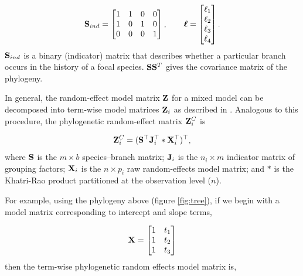 \documentclass[12pt]{article}
\begin{document}
\[
{\mathbf S}_{ind} = \begin{bmatrix}
1 & 1 & 0 & 0 \\ 
1 & 0 & 1 & 0 \\ 
0 & 0 & 0 & 1
\end{bmatrix} , 
\qquad
{\boldsymbol \ell} = \begin{bmatrix}
\ell_1 \\
\ell_2 \\
\ell_3 \\
\ell_4 
\end{bmatrix} .
\]
${\mathbf S}_{ind}$ is a binary (indicator) matrix that describes whether a particular branch occurs in the history of a focal species. 
${\mathbf S} {\mathbf S}^T$ gives the covariance matrix of the phylogeny. 

In general, the random-effect model matrix ${\mathbf Z}$ for a mixed model can be decomposed into term-wise model matrices ${\mathbf Z}_{i}$ as described in \citet{bates2015fitting}.
Analogous to this procedure, the phylogenetic random-effect matrix ${\mathbf Z}^{C}_{i}$ is

\begin{equation}
{\mathbf Z}^{C}_{i} = ({\mathbf S}^{\top}{\mathbf J}^{\top}_{i} \ast {\mathbf X}^{\top}_{i})^{\top}, \label{eq:ZC}
\end{equation}
where ${\mathbf S}$ is the $m \times b$ species--branch matrix; ${\mathbf J}_{i}$ is the $n_i \times m$ indicator matrix of grouping factors; ${\mathbf X}_{i}$ is the $n \times p_{i}$ raw random-effects model matrix; and $\ast$ is the Khatri-Rao product \citep{khatri1968solutions} partitioned at the observation level ($n$).

For example, using the phylogeny above (figure \ref{fig:tree}), if we begin with a model matrix corresponding to intercept and slope terms, 

\[
{\mathbf X} = \begin{bmatrix}
1 & t_1  \\ 
1 & t_2  \\ 
1 & t_3 
\end{bmatrix} 
\]
then the term-wise phylogenetic random effects model matrix is,
\end{document}
